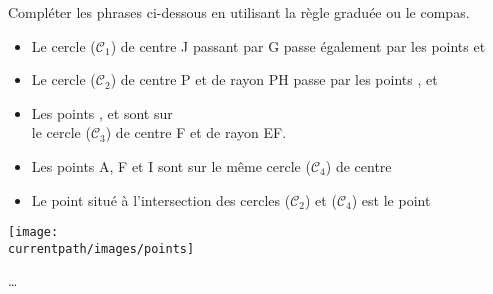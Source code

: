 \begin{exercice*}
  Compléter les phrases ci-dessous en utilisant la règle graduée ou le compas.
  \begin{itemize}
     \item Le cercle ($\mathcal{C}_1$) de centre J passant par G passe également par les points \makebox[0.15\linewidth]{\dotfill} et  \makebox[0.15\linewidth]{\dotfill} \\ [-5mm]
     \item Le cercle ($\mathcal{C}_2$) de centre P et de rayon PH passe par les points  \makebox[0.15\linewidth]{\dotfill},  \makebox[0.15\linewidth]{\dotfill} et  \makebox[0.15\linewidth]{\dotfill}
     \item Les points  \makebox[0.15\linewidth]{\dotfill},  \makebox[0.15\linewidth]{\dotfill} et  \makebox[0.15\linewidth]{\dotfill} sont sur \\
        le cercle ($\mathcal{C}_3$) de centre F et de rayon EF.
     \item Les points A, F et I sont sur le même cercle ($\mathcal{C}_4$) de centre  \makebox[0.3\linewidth]{\dotfill}
     \item Le point situé à l'intersection des cercles ($\mathcal{C}_2$) et ($\mathcal{C}_4$) est le point  \makebox[0.3\linewidth]{\dotfill}
  \end{itemize}
  \begin{center}
     \texttt{[image: \\currentpath/images/points]}
  \end{center}
\end{exercice*} 
\begin{corrige}
  \dots
\end{corrige}
